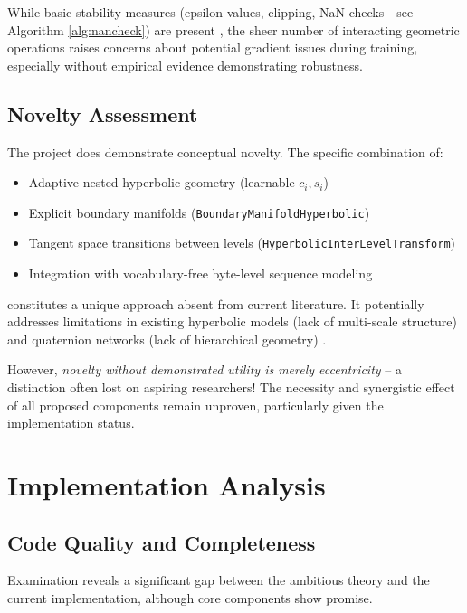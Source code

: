 \documentclass[11pt]{article}
\begin{document}
While basic stability measures (epsilon values, clipping, NaN checks - see Algorithm \ref{alg:nancheck}) are present \cite{BronsteinEtAl2021}, the sheer number of interacting geometric operations raises concerns about potential gradient issues during training, especially without empirical evidence demonstrating robustness.

\subsection{Novelty Assessment}

The project does demonstrate conceptual novelty. The specific combination of:
\begin{itemize}[noitemsep]
    \item Adaptive nested hyperbolic geometry (learnable $c_i, s_i$)
    \item Explicit boundary manifolds (\texttt{BoundaryManifoldHyperbolic})
    \item Tangent space transitions between levels (\texttt{HyperbolicInterLevelTransform})
    \item Integration with vocabulary-free byte-level sequence modeling
\end{itemize}
constitutes a unique approach absent from current literature. It potentially addresses limitations in existing hyperbolic models (lack of multi-scale structure) and quaternion networks (lack of hierarchical geometry) \cite{KhrulkovEtAl2020, NickelKiela2017}.

However, \textit{novelty without demonstrated utility is merely eccentricity} – a distinction often lost on aspiring researchers! The necessity and synergistic effect of all proposed components remain unproven, particularly given the implementation status.

\section{Implementation Analysis}

\subsection{Code Quality and Completeness}

Examination reveals a significant gap between the ambitious theory and the current implementation, although core components show promise.
\end{document}
